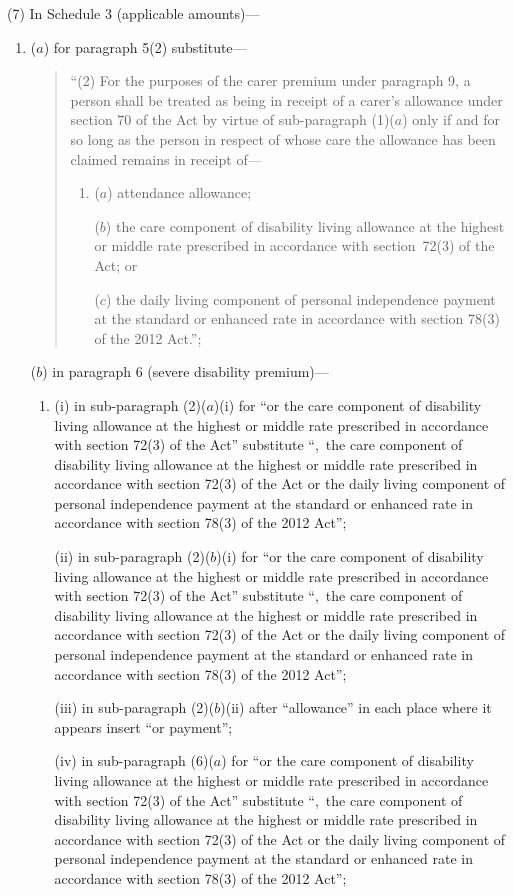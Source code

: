 \documentclass[12pt,a4paper]{article}
\begin{document}
(7) In Schedule 3 (applicable amounts)—
\begin{enumerate}\item[]
($a$) for paragraph 5(2) substitute—
\begin{quotation}
“(2) For the purposes of the carer premium under paragraph 9, a person shall be treated as being in receipt of a carer’s allowance under section 70 of the Act by virtue of sub-paragraph (1)($a$)  only if and for so long as the person in respect of whose care the allowance has been claimed remains in receipt of—
\begin{enumerate}\item[]
($a$) attendance allowance;

($b$) the care component of disability living allowance at the highest or middle rate prescribed in accordance with section~72(3) of the Act; or

($c$) the daily living component of personal independence payment at the standard or enhanced rate in accordance with section 78(3) of the 2012 Act.”;
\end{enumerate}
\end{quotation}

($b$) in paragraph 6 (severe disability premium)—
\begin{enumerate}\item[]
(i) in sub-paragraph (2)($a$)(i)  for “or the care component of disability living allowance at the highest or middle rate prescribed in accordance with section 72(3) of the Act” substitute “,~the care component of disability living allowance at the highest or middle rate prescribed in accordance with section 72(3) of the Act or the daily living component of personal independence payment at the standard or enhanced rate in accordance with section 78(3) of the 2012 Act”;

(ii) in sub-paragraph (2)($b$)(i)  for “or the care component of disability living allowance at the highest or middle rate prescribed in accordance with section 72(3) of the Act” substitute “,~the care component of disability living allowance at the highest or middle rate prescribed in accordance with section 72(3) of the Act or the daily living component of personal independence payment at the standard or enhanced rate in accordance with section 78(3) of the 2012 Act”;

(iii) in sub-paragraph (2)($b$)(ii)  after “allowance” in each place where it appears insert “or payment”;

(iv) in sub-paragraph (6)($a$)  for “or the care component of disability living allowance at the highest or middle rate prescribed in accordance with section 72(3) of the Act” substitute “,~the care component of disability living allowance at the highest or middle rate prescribed in accordance with section 72(3) of the Act or the daily living component of personal independence payment at the standard or enhanced rate in accordance with section 78(3) of the 2012 Act”;


\end{enumerate}
\end{enumerate}
\end{document}
